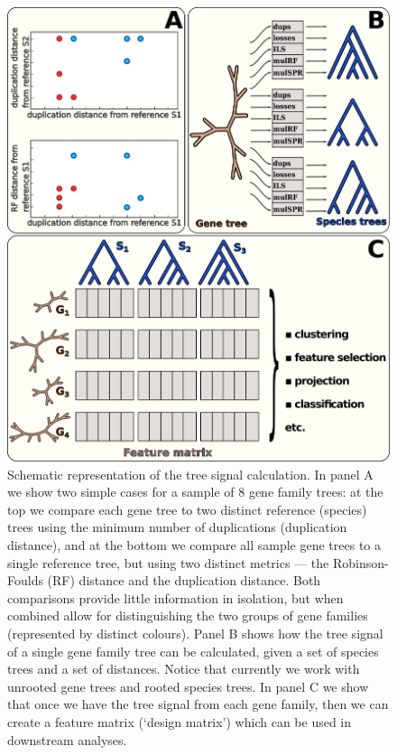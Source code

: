 \begin{figure}[!htbp]
\begin{minipage}{6.5in}\centering\includegraphics[width = 6in]{figure001.png}\end{minipage}
\caption{\label{figure01}
Schematic representation of the tree signal calculation. In panel A we show two simple cases for a sample of 8 gene
family trees: at the top we compare each gene tree to two distinct reference (species) trees using the minimum number of
duplications (duplication distance), and at the bottom we compare all sample gene trees to a single reference tree, but
using two distinct metrics --- the Robinson-Foulds (RF) distance and the duplication distance. Both comparisons provide
little information in isolation, but when combined allow for distinguishing the two groups of gene families (represented
by distinct colours). Panel B shows how the tree signal of a single gene family tree can be calculated, given a set of
species trees and a set of distances. Notice that currently we work with unrooted gene trees and rooted species trees.
In panel C we show that once we have the tree signal from each gene family, then we can create a feature matrix (‘design
matrix’) which can be used in downstream analyses.
}\end{figure}


